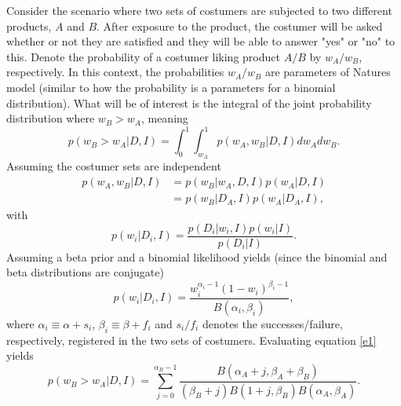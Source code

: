 \begin{example}
	Consider the scenario where two sets of costumers are subjected to two different products, $A$ and $B$. After exposure to the product, the costumer will be asked whether or not they are satisfied and they will be able to answer "yes" or "no" to this. Denote the probability of a costumer liking product $A/B$ by $w_A/w_B$, respectively. In this context, the probabilities $w_A/w_B$ are parameters of Natures model (similar to how the probability is a parameters for a binomial distribution). What will be of interest is the integral of the joint probability distribution where $w_B>w_A$, meaning
	\begin{equation}
		p(w_B > w_A|D,I)= \int_0^1\int_{w_A}^1p(w_A,w_B|D,I)dw_Adw_B.
		\label{e1}
	\end{equation}
	Assuming the costumer sets are independent
	\begin{equation}
		\begin{split}
			p(w_A,w_B|D,I) &= p(w_B|w_A,D,I)p(w_A|D,I)\\
			& = p(w_B|D_A,I)p(w_A|D_A,I),
		\end{split}
	\end{equation}
	with
	\begin{equation}
		p(w_i|D_i,I)=\frac{p(D_i|w_i,I)p(w_i|I)}{p(D_i|I)}.
	\end{equation}
	Assuming a beta prior and a binomial likelihood yields (since the binomial and beta distributions are conjugate)
	\begin{equation}
		p(w_i|D_i,I)=\frac{w_i^{\alpha_i-1}(1-w_i)^{\beta_i-1}}{B(\alpha_i,\beta_i)},
	\end{equation}
	where $\alpha_i\equiv \alpha+s_i$, $\beta_i\equiv \beta+f_i$ and $s_i/f_i$ denotes the successes/failure, respectively, registered in the two sets of costumers. Evaluating equation \eqref{e1} yields
	\begin{equation}
		p(w_B > w_A|D,I)= \sum_{j=0}^{\alpha_B-1}\frac{B(\alpha_A+j,\beta_A+\beta_B)}{(\beta_B+j)B(1+j,\beta_B)B(\alpha_A,\beta_A)}.
	\end{equation}
	
\end{example}




